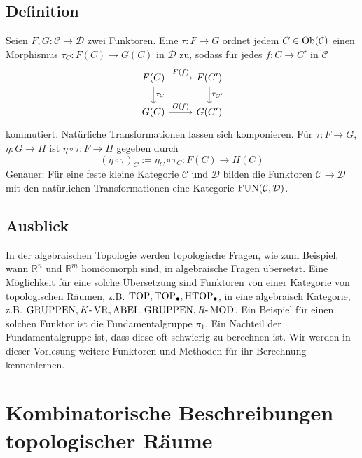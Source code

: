 \subsection[Definition: Natürliche Transformation]{Definition} %
\label{sub:16}
Seien $F,G : \mathcal{C} \to \mathcal{D}$ zwei Funktoren. Eine  $\tau : F \to G$ ordnet jedem $C \in \operatorname{Ob}(\mathcal{C})$ einen Morphismus
$\tau_C : F(C) \to G(C)$ in $\mathcal{D}$ zu, sodass für jedes $f : C \to C'$ in $\mathcal{C}$
\[
	\begin{tikzcd}
		F(C) \rar["F(f)"] \dar["\tau_C"]& F(C') \dar["\tau_{C'}"] \\
		G(C) \rar["G(f)"] & G(C')
	\end{tikzcd}
\]
kommutiert.
Natürliche Transformationen lassen sich komponieren. Für $\tau : F \to G$, $\eta : G \to H$ ist $\eta \circ \tau : F \to H$ gegeben durch
\[
	(\eta \circ \tau)_C :=  \eta_C \circ \tau_C : F(C) \to H(C)
\]
Genauer: Für eine feste kleine Kategorie $\mathcal{C}$ und $\mathcal{D}$ bilden die Funktoren $\mathcal{C} \to \mathcal{D}$ mit den natürlichen Transformationen eine 
Kategorie $\operatorname{FUN}(\mathcal{C}, \mathcal{D})$.

\subsection[Ausblick auf Kategorien und Funktoren in der algebraischer Topologie]{Ausblick} %
\label{sub:17}
In der algebraischen Topologie werden topologische Fragen, wie zum Beispiel, wann $\mathds{R}^n$ und $\mathds{R}^m$ homöomorph sind, in algebraische Fragen übersetzt. Eine
Möglichkeit für eine solche Übersetzung sind Funktoren von einer Kategorie von topologischen Räumen, z.B. $\operatorname{TOP}, \operatorname{TOP}_\bullet, \operatorname{HTOP}_\bullet$, in eine algebraisch Kategorie,
z.B. $\operatorname{GRUPPEN}, K\text{-}\operatorname{VR}, \operatorname{ABEL.GRUPPEN}, R\text{-}\operatorname{MOD}$. Ein Beispiel für einen solchen Funktor ist die Fundamentalgruppe $\pi_1$. Ein Nachteil der Fundamentalgruppe ist,
dass diese oft schwierig zu berechnen ist. Wir werden in dieser Vorlesung weitere Funktoren und Methoden für ihr Berechnung kennenlernen.

\newpage

\section{Kombinatorische Beschreibungen topologischer Räume} %
\label{sec:2}
